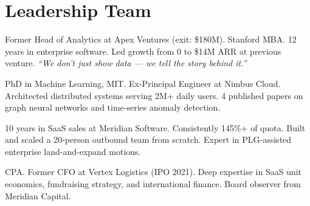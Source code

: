 \section{\sectionicon{\faUsers}Leadership Team}

\noindent
\begin{minipage}[t]{0.48\linewidth}
  \begin{tcolorbox}[nexacard, title={\faUser\enspace Clara Whitmore --- CEO \& Co-Founder}]
    \small
    Former Head of Analytics at Apex Ventures (exit: \$180M). Stanford MBA. 12 years
    in enterprise software. Led growth from 0 to \$14M ARR at previous venture.
    \textit{``We don't just show data --- we tell the story behind it.''}
  \end{tcolorbox}
\end{minipage}\hfill
\begin{minipage}[t]{0.48\linewidth}
  \begin{tcolorbox}[nexacard, title={\faUser\enspace Daniel Osei --- CTO \& Co-Founder}]
    \small
    PhD in Machine Learning, MIT. Ex-Principal Engineer at Nimbus Cloud. Architected
    distributed systems serving 2M+ daily users. 4 published papers on graph neural
    networks and time-series anomaly detection.
  \end{tcolorbox}
\end{minipage}

\par\vspace{4pt}

\noindent
\begin{minipage}[t]{0.48\linewidth}
  \begin{tcolorbox}[nexacard, title={\faUser\enspace Sofia Nakamura --- VP Sales}]
    \small
    10 years in SaaS sales at Meridian Software. Consistently 145\%+ of quota.
    Built and scaled a 20-person outbound team from scratch. Expert in PLG-assisted
    enterprise land-and-expand motions.
  \end{tcolorbox}
\end{minipage}\hfill
\begin{minipage}[t]{0.48\linewidth}
  \begin{tcolorbox}[nexacard, title={\faUser\enspace James Okonkwo --- CFO (Advisor)}]
    \small
    CPA. Former CFO at Vertex Logistics (IPO 2021). Deep expertise in SaaS unit
    economics, fundraising strategy, and international finance. Board observer
    from Meridian Capital.
  \end{tcolorbox}
\end{minipage}

